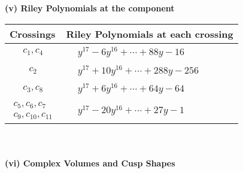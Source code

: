 \documentclass[1p]{elsarticle_modified}
\theoremstyle{definition}
\begin{document}
\newpage\renewcommand{\arraystretch}{1}
\flushleft \textbf{(v) Riley Polynomials at the component}\newline \\
\begin{tabular}{m{50pt}|m{274pt}}
Crossings & \hspace{64pt}Riley Polynomials at each crossing \\
\hline $$\begin{aligned}c_{1},c_{4}\end{aligned}$$&$\begin{aligned}
&y^{17}-6 y^{16}+\cdots+88 y-16
\end{aligned}$\\
\hline $$\begin{aligned}c_{2}\end{aligned}$$&$\begin{aligned}
&y^{17}+10 y^{16}+\cdots+288 y-256
\end{aligned}$\\
\hline $$\begin{aligned}c_{3},c_{8}\end{aligned}$$&$\begin{aligned}
&y^{17}+6 y^{16}+\cdots+64 y-64
\end{aligned}$\\
\hline $$\begin{aligned}c_{5},c_{6},c_{7}\\c_{9},c_{10},c_{11}\end{aligned}$$&$\begin{aligned}
&y^{17}-20 y^{16}+\cdots+27 y-1
\end{aligned}$\\
\hline
\end{tabular}\\~\\
\newpage\flushleft \textbf{(vi) Complex Volumes and Cusp Shapes}
\end{document}
